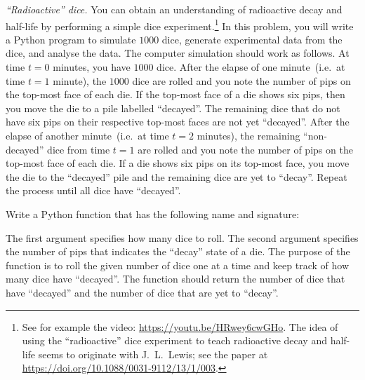 \documentclass[a4paper,oneside,12pt]{article}
\begin{document}
\begin{problem}
\item\label{prob:radioactive_dice}
  \emph{``Radioactive'' dice.}
  You can obtain an understanding of radioactive decay and half-life
  by performing a simple dice experiment.\footnote{
    See for example the video:
    \url{https://youtu.be/HRwey6cwGHo}.  The idea of using the
    ``radioactive'' dice experiment to teach radioactive decay and
    half-life seems to originate with J.~L.~Lewis; see the paper at
    \url{https://doi.org/10.1088/0031-9112/13/1/003}.
  }
  In this problem, you will write a Python program to simulate $1000$
  dice, generate experimental data from the dice, and analyse the
  data.  The computer simulation should work as follows.  At time
  $t = 0$ minutes, you have $1000$ dice.  After the elapse of one
  minute~(i.e.~at time $t = 1$ minute), the $1000$ dice are rolled and
  you note the number of pips on the top-most face of each die.  If
  the top-most face of a die shows six pips, then you move the die to
  a pile labelled ``decayed''.  The remaining dice that do not have
  six pips on their respective top-most faces are not yet ``decayed''.
  After the elapse of another minute~(i.e.~at time $t = 2$ minutes),
  the remaining ``non-decayed'' dice from time $t = 1$ are rolled and
  you note the number of pips on the top-most face of each die.  If a
  die shows six pips on its top-most face, you move the die to the
  ``decayed'' pile and the remaining dice are yet to ``decay''.
  Repeat the process until all dice have ``decayed''.
  \begin{packedenum}
  \item\label{subprob:radioactive_dice_simulation_roll_dice}
    Write a Python function that has the following name and signature:
    \begin{center}
    \end{center}
    The first argument  specifies how many dice to roll.  The
    second argument  specifies the number of pips
    that indicates the ``decay'' state of a die.  The purpose of the
    function  is to roll the given number of dice
    one at a time and keep track of how many dice have ``decayed''.
    The function should return the number of dice that have
    ``decayed'' and the number of dice that are yet to ``decay''.


\end{packedenum}
\end{problem}
\end{document}
